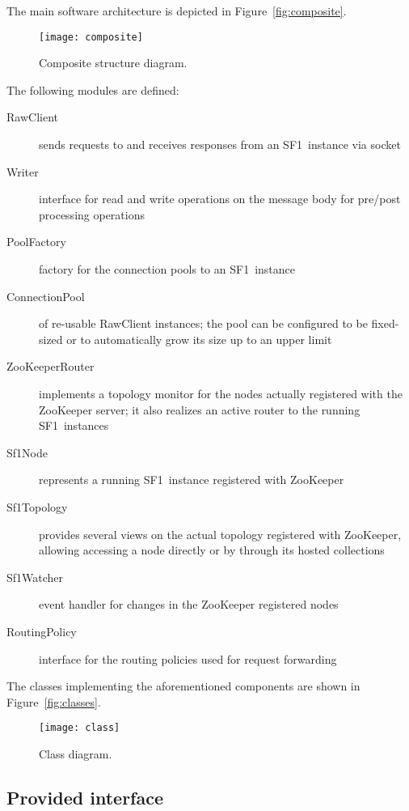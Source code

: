 \documentclass[a4paper,10pt]{article}
\newcommand{\sfr}{\textsf{SF1}}
\newcommand{\code}[1]{\textsf{#1}}
\begin{document}
The main software architecture is depicted in Figure~\vref{fig:composite}.
\begin{figure}[htb]
 \centering
 \texttt{[image: composite]}
 \caption{Composite structure diagram.}
 \label{fig:composite}
\end{figure}
The following modules are defined:
\begin{description}
 \item[\code{RawClient}] sends requests to and receives responses from an \sfr\ 
                         instance via socket
 \item[\code{Writer}] interface for read and write operations on the message 
                      body for pre/post processing operations
 \item[\code{PoolFactory}] factory for the connection pools to an \sfr\ instance
 \item[\code{ConnectionPool}] of re-usable \code{RawClient} instances; 
                              the pool can be configured to be fixed-sized or to 
                              automatically grow its size up to an upper limit
 \item[\code{ZooKeeperRouter}] implements a topology monitor for the nodes 
                               actually registered with the ZooKeeper server; 
                               it also realizes an active router to the 
                               running \sfr\ instances
 \item[\code{Sf1Node}] represents a running \sfr\ instance registered with ZooKeeper
 \item[\code{Sf1Topology}] provides several views on the actual topology registered 
                    with ZooKeeper, allowing accessing a node directly or by
                    through its hosted collections
 \item[\code{Sf1Watcher}] event handler for changes in the ZooKeeper registered nodes
 \item[\code{RoutingPolicy}] interface for the routing policies used for request forwarding
\end{description}
The classes implementing the aforementioned components are shown 
in Figure~\vref{fig:classes}.
\begin{figure}
 \centering
 \texttt{[image: class]}
 \caption{Class diagram.}
 \label{fig:classes}
\end{figure}

\subsection{Provided interface}
\end{document}
